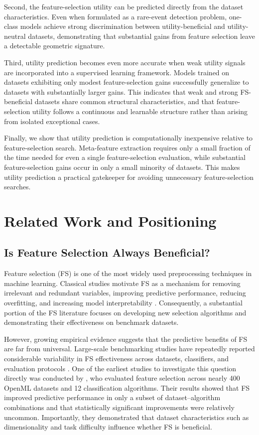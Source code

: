 \documentclass[preprint,12pt,authoryear]{elsarticle}
\begin{document}
Second, the feature-selection utility can be predicted directly from the dataset characteristics. Even when formulated as a rare-event detection problem, one-class models achieve strong discrimination between utility-beneficial and utility-neutral datasets, demonstrating that substantial gains from feature selection leave a detectable geometric signature.

Third, utility prediction becomes even more accurate when weak utility signals are incorporated into a supervised learning framework. Models trained on datasets exhibiting only modest feature-selection gains successfully generalize to datasets with substantially larger gains. This indicates that weak and strong FS-beneficial datasets share common structural characteristics, and that feature-selection utility follows a continuous and learnable structure rather than arising from isolated exceptional cases.


Finally, we show that utility prediction is computationally inexpensive relative to feature-selection search. Meta-feature extraction requires only a small fraction of the time needed for even a single feature-selection evaluation, while substantial feature-selection gains occur in only a small minority of datasets. This makes utility prediction a practical gatekeeper for avoiding unnecessary feature-selection searches.

\section{Related Work and Positioning}
\label{sec:related_work}

\subsection{Is Feature Selection Always Beneficial?}

Feature selection (FS) is one of the most widely used preprocessing techniques in machine learning. Classical studies motivate FS as a mechanism for removing irrelevant and redundant variables, improving predictive performance, reducing overfitting, and increasing model interpretability \citep{dash1997featureselection,kohavi1997wrappers,guyon2003introduction}. Consequently, a substantial portion of the FS literature focuses on developing new selection algorithms and demonstrating their effectiveness on benchmark datasets.

However, growing empirical evidence suggests that the predictive benefits of FS are far from universal. Large-scale benchmarking studies have repeatedly reported considerable variability in FS effectiveness across datasets, classifiers, and evaluation protocols \citep{bommert2020benchmark,bommert2022benchmark}. One of the earliest studies to investigate this question directly was conducted by \citet{post2016does}, who evaluated feature selection across nearly 400 OpenML datasets and 12 classification algorithms. Their results showed that FS improved predictive performance in only a subset of dataset–algorithm combinations and that statistically significant improvements were relatively uncommon. Importantly, they demonstrated that dataset characteristics such as dimensionality and task difficulty influence whether FS is beneficial.
\end{document}
